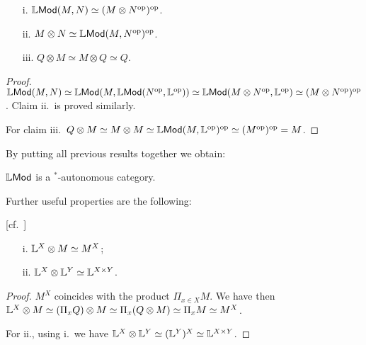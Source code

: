 \begin{proposition}
\begin{itemize}
\item[i.] $\mathbb{L}\mathsf{Mod}(M,N)\simeq (M\otimes N^{\mathrm{op}})^{\mathrm{op}}$.
\item[ii.] $M\otimes N\simeq \mathbb{L}\mathsf{Mod}(M, N^{\mathrm{op}})^{\mathrm{op}}$.
\item[iii.] $Q\otimes  M \simeq M\otimes Q\simeq Q$.
\end{itemize}
\end{proposition}
\begin{proof}
$\mathbb{L}\mathsf{Mod}(M,N)\simeq \mathbb{L}\mathsf{Mod}(M, \mathbb{L}\mathsf{Mod}(N^{\mathrm{op}},\mathbb{L}^{\mathrm{op}}))
\simeq \mathbb{L}\mathsf{Mod}(M\otimes N^{\mathrm{op}},\mathbb{L}^{\mathrm{op}})\simeq
(M\otimes N^{\mathrm{op}})^{\mathrm{op}}$.
Claim ii.~is proved similarly.

For claim iii.~$Q\otimes M\simeq M\otimes M\simeq \mathbb{L}\mathsf{Mod}(M, \mathbb{L}^{\mathrm{op}})^{\mathrm{op}}\simeq (M^{\mathrm{op}})^{\mathrm{op}}=M$. 
\end{proof}


By putting all previous results together we obtain:
\begin{theorem}
$\mathbb{L}\mathsf{Mod}$ is a $^{*}$-autonomous category.
\end{theorem}


Further useful properties are the following:


\begin{proposition}\label{prop:Qtensor}[cf.~\cite{Russo2007}]
\begin{itemize}
\item[i.] $\mathbb{L}^{X}\otimes M \simeq M^{X}$;
\item[ii.] $\mathbb{L}^{X}\otimes \mathbb{L}^{Y}\simeq \mathbb{L}^{X\times Y}$.
\end{itemize}
\end{proposition}
\begin{proof}
$M^{X}$ coincides with the product $\Pi_{x\in X}M$. We have then 
$\mathbb{L}^{X}\otimes M \simeq (\Pi_{x}Q)\otimes M \simeq \Pi_{x}(Q\otimes M) \simeq \Pi_{x}M\simeq M^{X}$.

For ii., using i.~we have $\mathbb{L}^{X}\otimes \mathbb{L}^{Y}\simeq( \mathbb{L}^{Y})^{X}\simeq \mathbb{L}^{X\times Y}$.
\end{proof}


